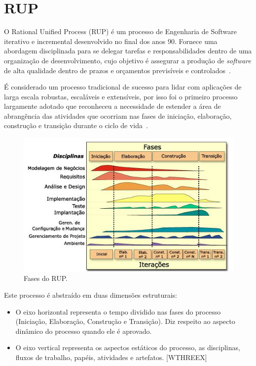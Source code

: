   \section{RUP}
O Rational Unified Process (RUP) é um processo de Engenharia de Software iterativo e incremental desenvolvido no final dos anos 90. Fornece uma abordagem disciplinada para se delegar tarefas e responsabilidades dentro de uma organização de desenvolvimento, cujo objetivo é assegurar a produção de \textit{software} de alta qualidade dentro de prazos e orçamentos previsíveis e controlados~\cite{kruchten}.

É considerado um processo tradicional de sucesso para lidar com aplicações de larga escala robustas, escaláveis e extensíveis, por isso foi o primeiro processo largamente adotado que reconheceu a necessidade de estender a área de abrangência das atividades que ocorriam nas fases de iniciação, elaboração, construção e transição durante o ciclo de vida~\cite{deanleffingwell}.

    \begin{figure}[!htbp]
    \centering
    \includegraphics[scale=3.0]{figuras/Fases_do_RUP_-_portugues}
    \caption[Fases do RUP]{Fases do RUP. \footnotemark}
    \label{fases-rup}
  \end{figure}
Este processo é abstraído em duas dimensões estruturais:
\begin{itemize}
\item O eixo horizontal representa o tempo dividido nas fases do processo 	(Iniciação, Elaboração, Construção e Transição). Diz 	respeito ao aspecto dinâmico do processo quando ele é aprovado.
\item O eixo vertical representa os aspectos estáticos do processo, as 	disciplinas, fluxos de trabalho, papéis, atividades e artefatos. 	[WTHREEX]
\end{itemize}

